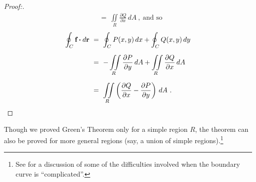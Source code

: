 \begin{proofbar}
\begin{proof}[Proof:]
\begin{align*}
   &=~ \iint\limits_{R} \frac{\partial Q}{\partial x}\,dA ~,~\text{and so}
 \end{align*}
\newpage
 \begin{align*}
  \oint_{C} \textbf{f} \bm{\cdot} d\textbf{r} ~&=~ \oint_C P(x,y)\,dx + \oint_C Q(x,y)\,dy\\[6pt]
   &=~ -\iint\limits_{R} \frac{\partial P}{\partial y}\,dA + \iint\limits_{R} \frac{\partial Q}{\partial x}\,dA\\[6pt]
   &=~ \iint\limits_{R} \left( \frac{\partial Q}{\partial x} - \frac{\partial P}{\partial y} \right)\,dA ~.
 \end{align*}
\end{proof}\vspace{-3mm}\end{proofbar}

Though we proved Green's Theorem only for a simple region $R$, the theorem can also be proved for more general
regions (say, a union of simple regions).\footnote{See \cite[\S\,15.31]{tm} for a discussion of
some of the difficulties involved when the boundary curve is ``complicated''.}

